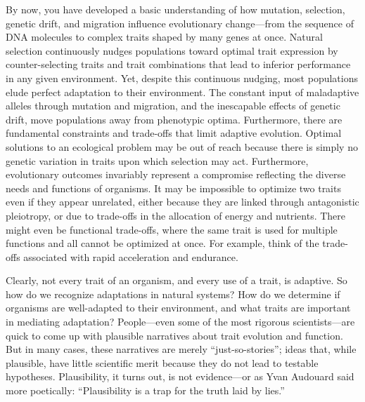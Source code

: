 \documentclass[
]{book}
\begin{document}
By now, you have developed a basic understanding of how mutation, selection, genetic drift, and migration influence evolutionary change---from the sequence of DNA molecules to complex traits shaped by many genes at once. Natural selection continuously nudges populations toward optimal trait expression by counter-selecting traits and trait combinations that lead to inferior performance in any given environment. Yet, despite this continuous nudging, most populations elude perfect adaptation to their environment. The constant input of maladaptive alleles through mutation and migration, and the inescapable effects of genetic drift, move populations away from phenotypic optima. Furthermore, there are fundamental constraints and trade-offs that limit adaptive evolution. Optimal solutions to an ecological problem may be out of reach because there is simply no genetic variation in traits upon which selection may act. Furthermore, evolutionary outcomes invariably represent a compromise reflecting the diverse needs and functions of organisms. It may be impossible to optimize two traits even if they appear unrelated, either because they are linked through antagonistic pleiotropy, or due to trade-offs in the allocation of energy and nutrients. There might even be functional trade-offs, where the same trait is used for multiple functions and all cannot be optimized at once. For example, think of the trade-offs associated with rapid acceleration and endurance.

Clearly, not every trait of an organism, and every use of a trait, is adaptive. So how do we recognize adaptations in natural systems? How do we determine if organisms are well-adapted to their environment, and what traits are important in mediating adaptation? People---even some of the most rigorous scientists---are quick to come up with plausible narratives about trait evolution and function. But in many cases, these narratives are merely ``just-so-stories''; ideas that, while plausible, have little scientific merit because they do not lead to testable hypotheses. Plausibility, it turns out, is not evidence---or as Yvan Audouard said more poetically: ``Plausibility is a trap for the truth laid by lies.''
\end{document}
